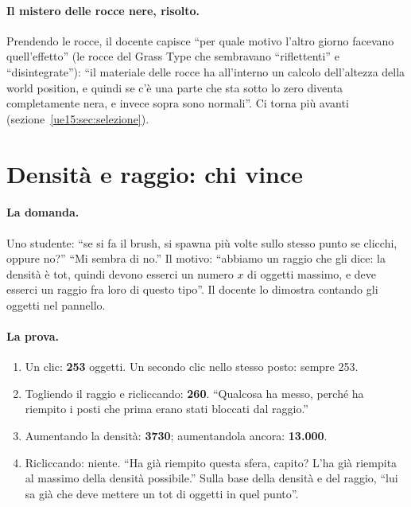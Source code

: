 \paragraph{Il mistero delle rocce nere, risolto.} Prendendo le rocce, il docente capisce
``per quale motivo l'altro giorno facevano quell'effetto'' (le rocce del Grass Type che
sembravano ``riflettenti'' e ``disintegrate''): ``il materiale delle rocce ha all'interno un
calcolo dell'altezza della world position, e quindi se c'è una parte che sta sotto lo zero
diventa completamente nera, e invece sopra sono normali''. Ci torna più avanti
(sezione~\ref{ue15:sec:selezione}).

\section{Densità e raggio: chi vince}
\label{ue15:sec:raggio}

\paragraph{La domanda.} Uno studente: ``se si fa il brush, si spawna più volte sullo stesso
punto se clicchi, oppure no?'' ``Mi sembra di no.'' Il motivo: ``abbiamo un raggio che gli
dice: la densità è tot, quindi devono esserci un numero $x$ di oggetti massimo, e deve esserci
un raggio fra loro di questo tipo''. Il docente lo dimostra contando gli oggetti nel pannello.

\paragraph{La prova.}
\begin{enumerate}
  \item Un clic: \textbf{253} oggetti. Un secondo clic nello stesso posto: sempre 253.
  \item Togliendo il raggio e ricliccando: \textbf{260}. ``Qualcosa ha messo, perché ha
        riempito i posti che prima erano stati bloccati dal raggio.''
  \item Aumentando la densità: \textbf{3730}; aumentandola ancora: \textbf{13.000}.
  \item Ricliccando: niente. ``Ha già riempito questa sfera, capito? L'ha già riempita al
        massimo della densità possibile.'' Sulla base della densità e del raggio, ``lui sa già
        che deve mettere un tot di oggetti in quel punto''.
\end{enumerate}

